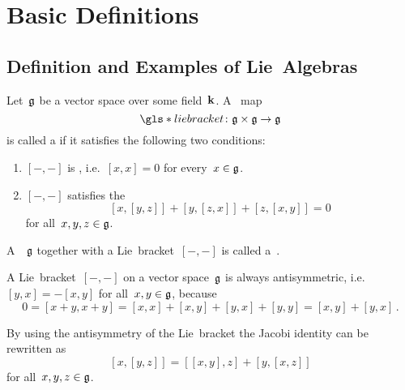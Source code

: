 \section{Basic Definitions}





\subsection{Definition and Examples of Lie~Algebras}


\begin{definition}
  Let~$\mathfrak{g}$ be a vector space over some field~$\kf$.
  A~{\bilinear{$\kf$}} map
  \[
    \gls*{lie bracket}
    \colon
    \glie \times \glie
    \to
    \glie
  \]
  is called a  if it satisfies the following two conditions:
  \begin{enumerate}
    \item
    $[-, -]$ is , i.e.~$[x,x] = 0$ for every~$x \in \mathfrak{g}$.
    \item
    $[-, -]$ satisfies the 
    \[
      [x,[y,z]] + [y,[z,x]] + [z,[x,y]]
      =
      0
    \]
    for all~$x,y,z \in \mathfrak{g}$.
  \end{enumerate}
  A~{\vectorspace{$\kf$}}~$\mathfrak{g}$ together with a Lie~bracket~$[-,-]$ is called a~.
\end{definition}


\begin{remark}
  A Lie~bracket~$[-, -]$ on a vector space~$\mathfrak{g}$ is always antisymmetric, i.e.~$[y,x] = -[x,y]$ for all~$x,y \in \mathfrak{g}$, because
  \[
    0
    =
    [x+y, x+y]
    =
    [x,x] + [x,y] + [y,x] + [y,y]
    =
    [x,y] + [y,x] \,.
  \]
\end{remark}


\begin{remark}
  By using the antisymmetry of the Lie~bracket the Jacobi identity can be rewritten as
  \[
    [x,[y,z]]
    =
    [[x,y],z] + [y,[x,z]]
  \]
  for all~$x, y, z \in \mathfrak{g}$.
\end{remark}


